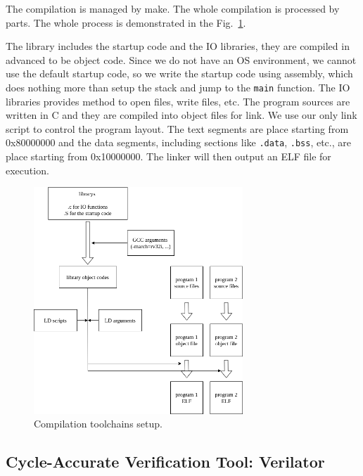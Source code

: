 The compilation is managed by make. The whole compilation is processed by parts. The whole process is demonstrated in the Fig.~\ref{fig:compilation}.


The library includes the startup code and the IO libraries, they are compiled in advanced to be object code. Since we do not have an OS environment, we cannot use the default startup code, so we write the startup code using assembly, which does nothing more than setup the stack and jump to the \texttt{main} function. The IO libraries provides method to open files, write files, etc.  The program sources are written in C and they are compiled into object files for link. We use our only link script to control the program layout. The text segments are place starting from 0x80000000 and the data segments, including sections like \texttt{.data}, \texttt{.bss}, etc., are place starting from 0x10000000. The linker will then output an ELF file for execution.

\begin{figure}[!htp]
    \centering
    \includegraphics[width=0.7\textwidth]{figure/compilation.png}
    \caption{Compilation toolchains setup.}
    \label{fig:compilation}
\end{figure}

\subsection{Cycle-Accurate Verification Tool: Verilator} %

